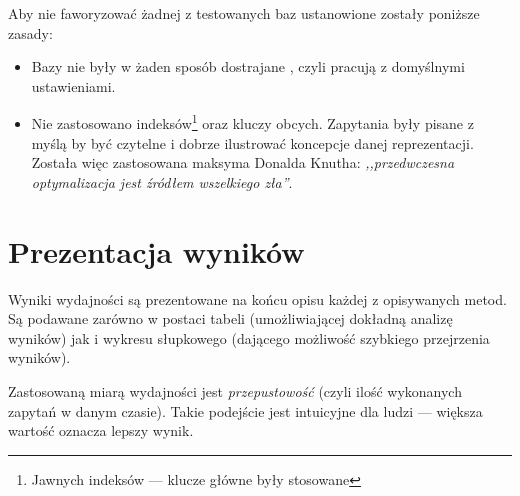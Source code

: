 Aby nie faworyzować żadnej z testowanych baz ustanowione zostały poniższe zasady:
\begin{itemize}
    \item Bazy nie były w żaden sposób dostrajane , czyli pracują z domyślnymi ustawieniami.
    \item Nie zastosowano indeksów\footnote{Jawnych indeksów --- klucze główne były stosowane}
        oraz kluczy obcych.
    Zapytania były pisane z myślą by być czytelne i dobrze ilustrować koncepcje danej reprezentacji.
    Została więc zastosowana maksyma Donalda Knutha: \emph{,,przedwczesna optymalizacja jest źródłem wszelkiego zła''}.
\end{itemize}

\section*{Prezentacja wyników}

Wyniki wydajności są prezentowane na końcu opisu każdej z opisywanych metod.
Są podawane zarówno w postaci tabeli (umożliwiającej dokładną analizę wyników)
jak i wykresu słupkowego (dającego możliwość szybkiego przejrzenia wyników).


Zastosowaną miarą wydajności jest \emph{przepustowość} (czyli ilość wykonanych zapytań w danym czasie).
Takie podejście jest intuicyjne dla ludzi --- większa wartość oznacza lepszy wynik. 

